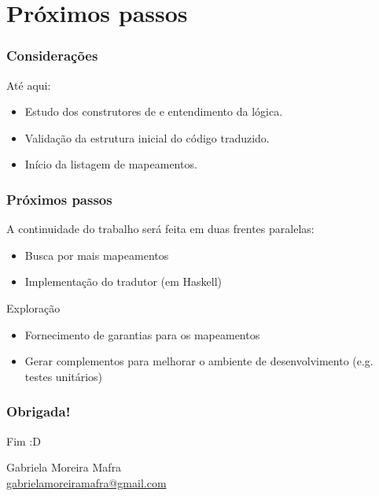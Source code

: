 \documentclass{beamer}
\begin{document}
\section{Próximos passos}

\begin{frame}
  \frametitle{Considerações}

  Até aqui:
  \begin{itemize}
    \item Estudo dos construtores de \TLA e entendimento da lógica.
    \item Validação da estrutura inicial do código traduzido.
    \item Início da listagem de mapeamentos.
  \end{itemize}

\end{frame}

\begin{frame}
  \frametitle{Próximos passos}

  A continuidade do trabalho será feita em duas frentes paralelas:
  \begin{itemize}
    \item Busca por mais mapeamentos
    \item Implementação do tradutor (em Haskell)
  \end{itemize}\medskip\pause

  \begin{block}{Exploração}
    \begin{itemize}
      \item Fornecimento de garantias para os mapeamentos
      \item Gerar complementos para melhorar o ambiente de desenvolvimento (e.g. testes unitários)
    \end{itemize}
  \end{block}

\end{frame}

\begin{frame}
  \frametitle{Obrigada!}

  {\Huge Fim :D}\bigskip

  Gabriela Moreira Mafra\\\smallskip
  {\url{gabrielamoreiramafra@gmail.com}}

\end{frame}
\end{document}
